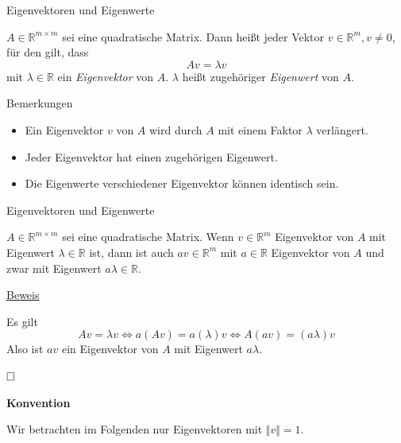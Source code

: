 \documentclass[
  8pt,
  ignorenonframetext,
]{beamer}
\providecommand{\tightlist}{%
  \setlength{\itemsep}{0pt}\setlength{\parskip}{0pt}}
\begin{document}
\begin{frame}{Eigenvektoren und Eigenwerte}
\protect\hypertarget{eigenvektoren-und-eigenwerte}{}
\small
\begin{definition}
$A \in \mathbb{R}^{m \times m}$ sei eine quadratische Matrix. Dann heißt jeder
Vektor $v \in \mathbb{R}^m, v \neq 0$, für den gilt, dass
\begin{equation}
Av  = \lambda v
\end{equation}
mit $\lambda \in \mathbb{R}$ ein \textit{Eigenvektor} von $A$. $\lambda$
heißt zugehöriger \textit{Eigenwert} von $A$.
\end{definition}

\small

Bemerkungen

\begin{itemize}
\tightlist
\item
  Ein Eigenvektor \(v\) von \(A\) wird durch \(A\) mit einem Faktor
  \(\lambda\) verlängert.
\item
  Jeder Eigenvektor hat einen zugehörigen Eigenwert.
\item
  Die Eigenwerte verschiedener Eigenvektor können identisch sein.
\end{itemize}
\end{frame}

\begin{frame}{Eigenvektoren und Eigenwerte}
\protect\hypertarget{eigenvektoren-und-eigenwerte-1}{}
\small
\begin{theorem}
\justifying
\normalfont
$A \in \mathbb{R}^{m \times m}$ sei eine quadratische Matrix. Wenn $v \in \mathbb{R}^m$
Eigenvektor von $A$ mit Eigenwert $\lambda \in \mathbb{R}$ ist, dann ist auch $av \in \mathbb{R}^m $
mit $a \in \mathbb{R}$ Eigenvektor von $A$ und zwar mit Eigenwert $a\lambda \in \mathbb{R}$.
\end{theorem}

\footnotesize

\underline{Beweis}

Es gilt \begin{equation}
Av = \lambda v \Leftrightarrow a(Av) = a(\lambda)v \Leftrightarrow A(av) = (a\lambda)v
\end{equation} Also ist \(av\) ein Eigenvektor von \(A\) mit Eigenwert
\(a\lambda\).

\(\hfill\Box\)

\small

\textbf{Konvention}

Wir betrachten im Folgenden nur Eigenvektoren mit \(\Vert v \Vert = 1\).
\end{frame}
\end{document}
